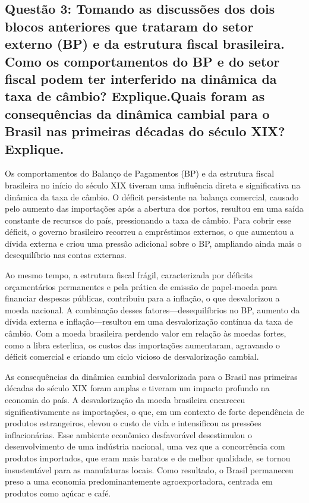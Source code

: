 \documentclass[a4paper,12pt]{article}[abntex2]
\begin{document}
\subsection{\textbf{Questão 3: Tomando as discussões dos dois blocos anteriores que trataram do setor externo (BP) e da estrutura fiscal brasileira. Como os comportamentos do BP e do setor fiscal podem ter interferido na dinâmica da taxa de câmbio? Explique.Quais foram as consequências da dinâmica cambial para o Brasil nas primeiras décadas do século XIX? Explique.}}

Os comportamentos do Balanço de Pagamentos (BP) e da estrutura fiscal brasileira no início do século XIX tiveram uma influência direta e significativa na dinâmica da taxa de câmbio. O déficit persistente na balança comercial, causado pelo aumento das importações após a abertura dos portos, resultou em uma saída constante de recursos do país, pressionando a taxa de câmbio. Para cobrir esse déficit, o governo brasileiro recorreu a empréstimos externos, o que aumentou a dívida externa e criou uma pressão adicional sobre o BP, ampliando ainda mais o desequilíbrio nas contas externas.

Ao mesmo tempo, a estrutura fiscal frágil, caracterizada por déficits orçamentários permanentes e pela prática de emissão de papel-moeda para financiar despesas públicas, contribuiu para a inflação, o que desvalorizou a moeda nacional. A combinação desses fatores—desequilíbrios no BP, aumento da dívida externa e inflação—resultou em uma desvalorização contínua da taxa de câmbio. Com a moeda brasileira perdendo valor em relação às moedas fortes, como a libra esterlina, os custos das importações aumentaram, agravando o déficit comercial e criando um ciclo vicioso de desvalorização cambial.

As consequências da dinâmica cambial desvalorizada para o Brasil nas primeiras décadas do século XIX foram amplas e tiveram um impacto profundo na economia do país. A desvalorização da moeda brasileira encareceu significativamente as importações, o que, em um contexto de forte dependência de produtos estrangeiros, elevou o custo de vida e intensificou as pressões inflacionárias. Esse ambiente econômico desfavorável desestimulou o desenvolvimento de uma indústria nacional, uma vez que a concorrência com produtos importados, que eram mais baratos e de melhor qualidade, se tornou insustentável para as manufaturas locais. Como resultado, o Brasil permaneceu preso a uma economia predominantemente agroexportadora, centrada em produtos como açúcar e café.
\end{document}
